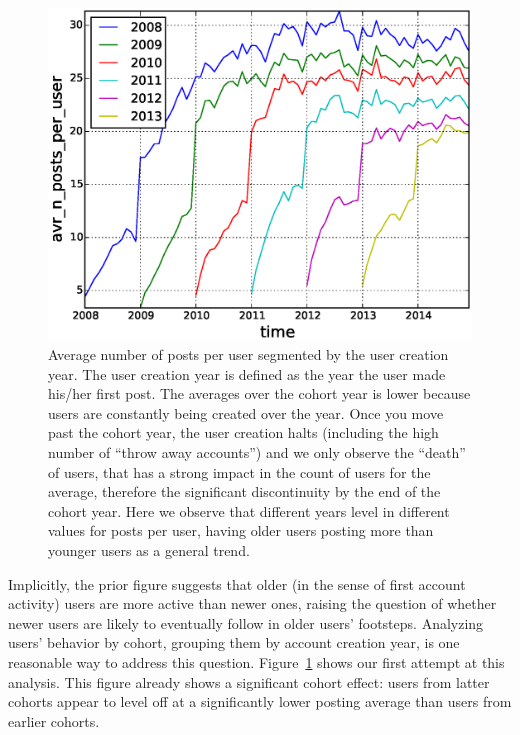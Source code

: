 \begin{figure}[!tb]
\centering
\includegraphics[scale=0.4]{./images/avr_posts_per_user_over_time_cohorts.eps}
\caption{Average number of posts per user segmented by the user creation year. The user creation year is defined as the year the user made his/her first post. The averages over the cohort year is lower because users are constantly being created over the year. Once you move past the cohort year, the user creation halts (including the high number of ``throw away accounts'') and we only observe the ``death'' of users, that has a strong impact in the count of users for the average, therefore the significant discontinuity by the end of the cohort year. Here we observe that different years level in different values for posts per user, having older users posting more than younger users as a general trend.}
\label{fig:avr_posts_per_user_over_time_cohorts}
\end{figure}

Implicitly, the prior figure suggests that older (in the sense of first account activity) users are more active than newer ones, raising the question of whether newer users
are likely to eventually follow in older users' footsteps.  Analyzing users' behavior by cohort, grouping them by account creation year, is one reasonable way to address this question.  Figure~\ref{fig:avr_posts_per_user_over_time_cohorts} shows our first attempt at this analysis.  This figure already shows a significant cohort effect: users from latter cohorts appear to level off at a significantly lower posting average than users from earlier cohorts.  

